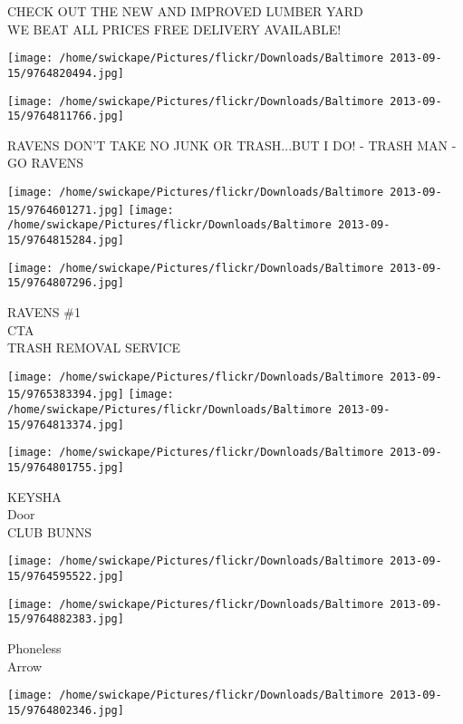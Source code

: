 \documentclass[10pt,letterpaper]{article}
\begin{document}
CHECK OUT THE NEW AND IMPROVED LUMBER YARD\\
WE BEAT ALL PRICES FREE DELIVERY AVAILABLE!
\pagebreak

\texttt{[image: /home/swickape/Pictures/flickr/Downloads/Baltimore 2013-09-15/9764820494.jpg]}

\vspace{0.25in}
\texttt{[image: /home/swickape/Pictures/flickr/Downloads/Baltimore 2013-09-15/9764811766.jpg]}

RAVENS DON'T TAKE NO JUNK OR TRASH...BUT I DO!  {-} TRASH MAN {-}\\
GO RAVENS
\pagebreak

\texttt{[image: /home/swickape/Pictures/flickr/Downloads/Baltimore 2013-09-15/9764601271.jpg]}
\texttt{[image: /home/swickape/Pictures/flickr/Downloads/Baltimore 2013-09-15/9764815284.jpg]}

\vspace{0.25in}
\texttt{[image: /home/swickape/Pictures/flickr/Downloads/Baltimore 2013-09-15/9764807296.jpg]}

RAVENS \#1\\
CTA\\
TRASH REMOVAL SERVICE
\pagebreak

\texttt{[image: /home/swickape/Pictures/flickr/Downloads/Baltimore 2013-09-15/9765383394.jpg]}
\texttt{[image: /home/swickape/Pictures/flickr/Downloads/Baltimore 2013-09-15/9764813374.jpg]}

\vspace{0.25in}
\texttt{[image: /home/swickape/Pictures/flickr/Downloads/Baltimore 2013-09-15/9764801755.jpg]}

KEYSHA\\
Door\\
CLUB BUNNS
\pagebreak

\texttt{[image: /home/swickape/Pictures/flickr/Downloads/Baltimore 2013-09-15/9764595522.jpg]}

\vspace{0.25in}
\texttt{[image: /home/swickape/Pictures/flickr/Downloads/Baltimore 2013-09-15/9764882383.jpg]}

Phoneless\\
Arrow
\pagebreak

\texttt{[image: /home/swickape/Pictures/flickr/Downloads/Baltimore 2013-09-15/9764802346.jpg]}
\end{document}
